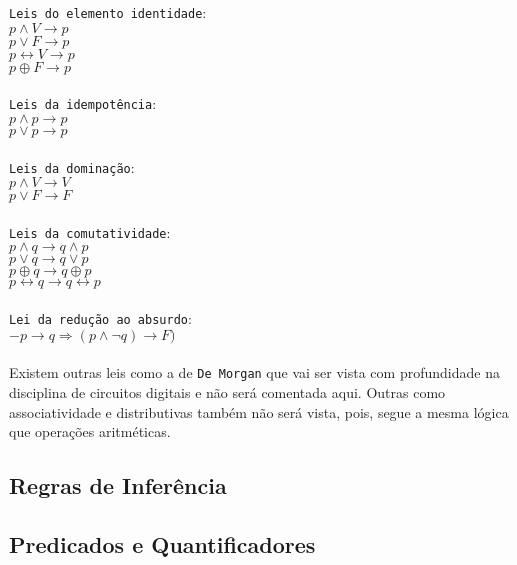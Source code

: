 \documentclass[12pt, onecolumn]{article}
\begin{document}
	\texttt{Leis do elemento identidade}:\\
	$p \land V \rightarrow p$\\
	$p \lor F \rightarrow p$\\
	$p \leftrightarrow V \rightarrow p$\\
	$p \oplus F \rightarrow p$\\	
	\\
	\texttt{Leis da idempotência}:\\
	$p \land p \rightarrow p$\\
	$p \lor p \rightarrow p$\\
	\\
	\texttt{Leis da dominação}:\\
	$p \land V \rightarrow V$\\
	$p \lor F \rightarrow F$\\
	\\
	\texttt{Leis da comutatividade}:\\
	$p \land q \rightarrow q \land p$\\
	$p \lor q \rightarrow q \lor p$\\
	$p \oplus q \rightarrow q \oplus p$\\
	$p \leftrightarrow q \rightarrow q \leftrightarrow p$\\
	\\
	\texttt{Lei da redução ao absurdo}:\\
	$ -p \longrightarrow q \Rightarrow (p \land \lnot q) \longrightarrow F)$\\
	\\
	
	Existem outras leis como a de \texttt{De Morgan} que vai ser vista com
	profundidade na disciplina de circuitos digitais e não será comentada aqui.
	Outras como associatividade e distributivas também não será vista, pois, 
	segue a mesma lógica que operações aritméticas.

		\subsection{\cetering Regras de Inferência}

		\subsection{\centering Predicados e Quantificadores}
\end{document}
